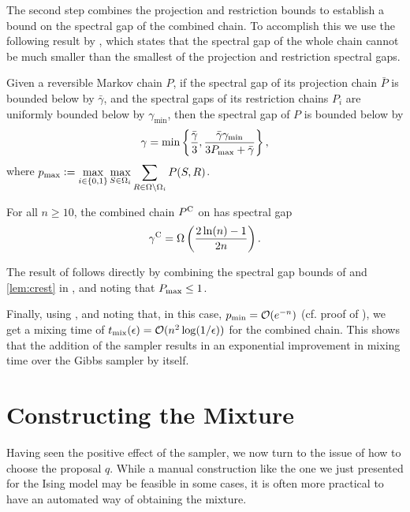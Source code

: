 The second step combines the projection and restriction bounds to establish a bound on the spectral gap of the combined chain.
To accomplish this we use the following result by \cite{jerrum04poincare}, which states that the spectral gap of the whole chain cannot be much smaller than the smallest of the projection and restriction spectral gaps.
\begin{theorem} \label{thm:jerrum04}
  Given a reversible Markov chain $P$, if the spectral gap of its projection chain $\bar{P}$ is bounded below by $\bar{\gamma}$, and the spectral gaps of its restriction chains $P_i$ are uniformly bounded below by $\gamma_{\textrm{min}}$, then the spectral gap of $P$ is bounded below by
  \begin{align*}
    \gamma = \min\left\{ \frac{\bar{\gamma}}{3}, \frac{\bar{\gamma}\gamma_{\textrm{min}}}{3P_{\textrm{max}} + \bar{\gamma}} \right\},
  \end{align*}
  where $p_{\textrm{max}} \vcentcolon= \displaystyle\max_{i \in \{0, 1\}}\max_{S \in \Omega_i} \sum_{R \in \Omega \setminus \Omega_i} P(S, R)$.
\end{theorem}

\begin{theorem}
  For all $n \geq 10$, the combined chain $P^{\mathrm{C}}$ on \ising{} has spectral gap
  \begin{align*}
    \gamma^{\mathrm{C}} = \Omega\left( \displaystyle\frac{2\ln(n) - 1}{2n} \right).
  \end{align*}
\end{theorem}

The result of  follows directly by combining the spectral gap bounds of  and \ref{lem:crest} in , and noting that $P_{\textrm{max}} \leq 1$.

Finally, using , and noting that, in this case, $p_{\textrm{min}} = \mathcal{O}(e^{-n})$ (cf. proof of ), we get a mixing time of $t_{\mathrm{mix}}(\epsilon) = \mathcal{O}(n^2 \log(1 / \epsilon))$ for the combined chain.
This shows that the addition of the \Ms{} sampler results in an exponential improvement in mixing time over the Gibbs sampler by itself.

\section{Constructing the Mixture}
Having seen the positive effect of the \Ms{} sampler, we now turn to the issue of how to choose the proposal $q$.
While a manual construction like the one we just presented for the Ising model may be feasible in some cases, it is often more practical to have an automated way of obtaining the mixture.

